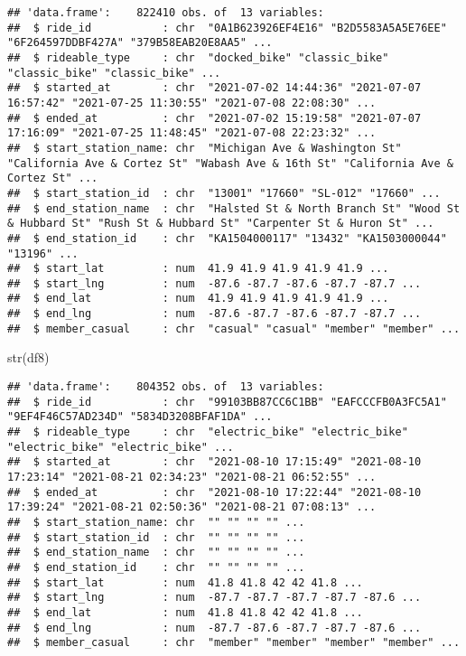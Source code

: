 \documentclass[
]{article}
\newenvironment{Shaded}{\begin{snugshade}}{\end{snugshade}}
\newcommand{\FunctionTok}[1]{\textcolor[rgb]{0.00,0.00,0.00}{#1}}
\newcommand{\NormalTok}[1]{#1}
\begin{document}
\begin{verbatim}
## 'data.frame':    822410 obs. of  13 variables:
##  $ ride_id           : chr  "0A1B623926EF4E16" "B2D5583A5A5E76EE" "6F264597DDBF427A" "379B58EAB20E8AA5" ...
##  $ rideable_type     : chr  "docked_bike" "classic_bike" "classic_bike" "classic_bike" ...
##  $ started_at        : chr  "2021-07-02 14:44:36" "2021-07-07 16:57:42" "2021-07-25 11:30:55" "2021-07-08 22:08:30" ...
##  $ ended_at          : chr  "2021-07-02 15:19:58" "2021-07-07 17:16:09" "2021-07-25 11:48:45" "2021-07-08 22:23:32" ...
##  $ start_station_name: chr  "Michigan Ave & Washington St" "California Ave & Cortez St" "Wabash Ave & 16th St" "California Ave & Cortez St" ...
##  $ start_station_id  : chr  "13001" "17660" "SL-012" "17660" ...
##  $ end_station_name  : chr  "Halsted St & North Branch St" "Wood St & Hubbard St" "Rush St & Hubbard St" "Carpenter St & Huron St" ...
##  $ end_station_id    : chr  "KA1504000117" "13432" "KA1503000044" "13196" ...
##  $ start_lat         : num  41.9 41.9 41.9 41.9 41.9 ...
##  $ start_lng         : num  -87.6 -87.7 -87.6 -87.7 -87.7 ...
##  $ end_lat           : num  41.9 41.9 41.9 41.9 41.9 ...
##  $ end_lng           : num  -87.6 -87.7 -87.6 -87.7 -87.7 ...
##  $ member_casual     : chr  "casual" "casual" "member" "member" ...
\end{verbatim}

\begin{Shaded}
\begin{Highlighting}[]
\FunctionTok{str}\NormalTok{(df8)}
\end{Highlighting}
\end{Shaded}

\begin{verbatim}
## 'data.frame':    804352 obs. of  13 variables:
##  $ ride_id           : chr  "99103BB87CC6C1BB" "EAFCCCFB0A3FC5A1" "9EF4F46C57AD234D" "5834D3208BFAF1DA" ...
##  $ rideable_type     : chr  "electric_bike" "electric_bike" "electric_bike" "electric_bike" ...
##  $ started_at        : chr  "2021-08-10 17:15:49" "2021-08-10 17:23:14" "2021-08-21 02:34:23" "2021-08-21 06:52:55" ...
##  $ ended_at          : chr  "2021-08-10 17:22:44" "2021-08-10 17:39:24" "2021-08-21 02:50:36" "2021-08-21 07:08:13" ...
##  $ start_station_name: chr  "" "" "" "" ...
##  $ start_station_id  : chr  "" "" "" "" ...
##  $ end_station_name  : chr  "" "" "" "" ...
##  $ end_station_id    : chr  "" "" "" "" ...
##  $ start_lat         : num  41.8 41.8 42 42 41.8 ...
##  $ start_lng         : num  -87.7 -87.7 -87.7 -87.7 -87.6 ...
##  $ end_lat           : num  41.8 41.8 42 42 41.8 ...
##  $ end_lng           : num  -87.7 -87.6 -87.7 -87.7 -87.6 ...
##  $ member_casual     : chr  "member" "member" "member" "member" ...
\end{verbatim}
\end{document}
